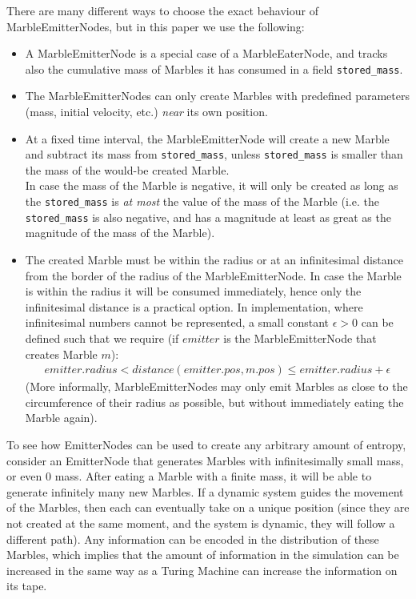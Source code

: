 There are many different ways to choose the exact behaviour of MarbleEmitterNodes, but in this paper we use the following:
\begin{itemize}
    \item A MarbleEmitterNode is a special case of a MarbleEaterNode, and tracks also the cumulative mass of Marbles it has consumed in a field \texttt{stored\_mass}.
    \item The MarbleEmitterNodes can only create Marbles with predefined parameters (mass, initial velocity, etc.) \textit{near} its own position.
    \item At a fixed time interval, the MarbleEmitterNode will create a new Marble and subtract its mass from \texttt{stored\_mass}, unless \texttt{stored\_mass} is smaller than the mass of the would-be created Marble. \\
    In case the mass of the Marble is negative, it will only be created as long as the \texttt{stored\_mass} is \textit{at most} the value of the mass of the Marble (i.e. the \texttt{stored\_mass} is also negative, and has a magnitude at least as great as the magnitude of the mass of the Marble).
    \item The created Marble must be within the radius or at an infinitesimal distance from the border of the radius of the MarbleEmitterNode. In case the Marble is within the radius it will be consumed immediately, hence only the infinitesimal distance is a practical option. In implementation, where infinitesimal numbers cannot be represented, a small constant $\epsilon > 0$ can be defined such that we require (if $emitter$ is the MarbleEmitterNode that creates Marble $m$):
    \begin{align}
        emitter.radius < distance(emitter.pos, m.pos) \leq emitter.radius + \epsilon
    \end{align}
	(More informally, MarbleEmitterNodes may only emit Marbles as close to the circumference of their radius as possible, but without immediately eating the Marble again).
\end{itemize}

To see how EmitterNodes can be used to create any arbitrary amount of entropy, consider an EmitterNode that generates Marbles with infinitesimally small mass, or even 0 mass. After eating a Marble with a finite mass, it will be able to generate infinitely many new Marbles. If a dynamic system guides the movement of the Marbles, then each can eventually take on a unique position (since they are not created at the same moment, and the system is dynamic, they will follow a different path). Any information can be encoded in the distribution of these Marbles, which implies that the amount of information in the simulation can be increased in the same way as a Turing Machine can increase the information on its tape.

